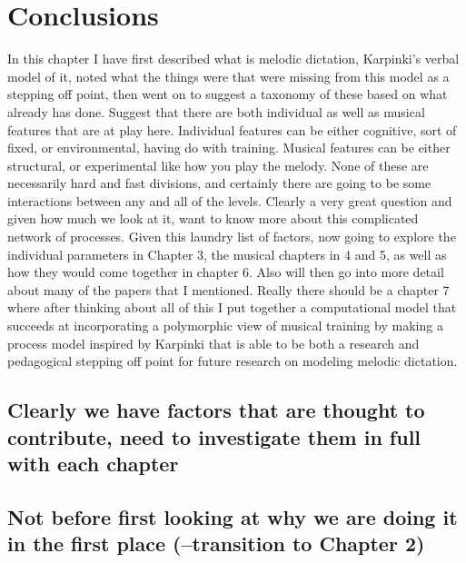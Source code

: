 \documentclass[]{book}
\theoremstyle{definition}
\theoremstyle{definition}
\theoremstyle{definition}
\theoremstyle{remark}
\begin{document}
\hypertarget{conclusions}{%
\section{Conclusions}\label{conclusions}}

In this chapter I have first described what is melodic dictation,
Karpinki's verbal model of it, noted what the things were that were
missing from this model as a stepping off point, then went on to suggest
a taxonomy of these based on what already has done. Suggest that there
are both individual as well as musical features that are at play here.
Individual features can be either cognitive, sort of fixed, or
environmental, having do with training. Musical features can be either
structural, or experimental like how you play the melody. None of these
are necessarily hard and fast divisions, and certainly there are going
to be some interactions between any and all of the levels. Clearly a
very great question and given how much we look at it, want to know more
about this complicated network of processes. Given this laundry list of
factors, now going to explore the individual parameters in Chapter 3,
the musical chapters in 4 and 5, as well as how they would come together
in chapter 6. Also will then go into more detail about many of the
papers that I mentioned. Really there should be a chapter 7 where after
thinking about all of this I put together a computational model that
succeeds at incorporating a polymorphic view of musical training by
making a process model inspired by Karpinki that is able to be both a
research and pedagogical stepping off point for future research on
modeling melodic dictation.

\hypertarget{clearly-we-have-factors-that-are-thought-to-contribute-need-to-investigate-them-in-full-with-each-chapter}{%
\subsection{Clearly we have factors that are thought to contribute, need
to investigate them in full with each
chapter}\label{clearly-we-have-factors-that-are-thought-to-contribute-need-to-investigate-them-in-full-with-each-chapter}}

\hypertarget{not-before-first-looking-at-why-we-are-doing-it-in-the-first-place-transition-to-chapter-2}{%
\subsection{Not before first looking at why we are doing it in the first
place (--transition to Chapter
2)}\label{not-before-first-looking-at-why-we-are-doing-it-in-the-first-place-transition-to-chapter-2}}
\end{document}
